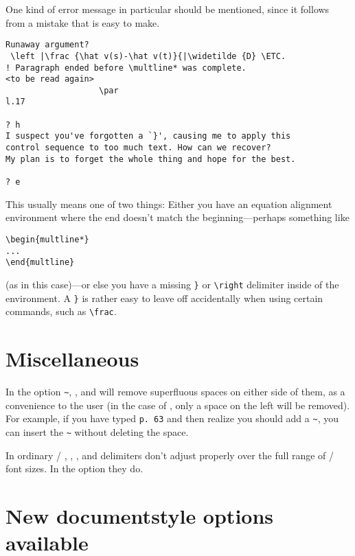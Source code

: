 One kind of error message in particular should be mentioned, since it
follows from a mistake that is easy to make.

\begin{verbatim}
Runaway argument?
 \left |\frac {\hat v(s)-\hat v(t)}{|\widetilde {D} \ETC.
! Paragraph ended before \multline* was complete.
<to be read again>
                   \par
l.17

? h
I suspect you've forgotten a `}', causing me to apply this
control sequence to too much text. How can we recover?
My plan is to forget the whole thing and hope for the best.

? e
\end{verbatim}

This usually means one of two things: Either you have an
equation alignment environment where the
end doesn't match the beginning---perhaps something
like
\begin{verbatim}
\begin{multline*}
...
\end{multline}
\end{verbatim}
(as in this case)---or else you have a missing \verb=}= or \verb=\right=
delimiter inside of the environment.  A \verb=}= is rather easy
to leave off accidentally when using certain commands,
such as \verb=\frac=.

\section{Miscellaneous}

In the  option \verb"~", \cs{/}, and
 will remove superfluous spaces on either side of them, as a
convenience to the user (in the case of \cs{/}, only a space on the
left will be removed).  For example, if you have typed
\verb"p."~\verb"63" and then realize you should add a \verb"~", you can
insert the \verb"~" without deleting the space.

In ordinary \latex/ , , , and 
delimiters don't adjust properly over the full range of \latex/ font
sizes.  In the  option they do.

\section{New documentstyle options available}
\label{s:options}

